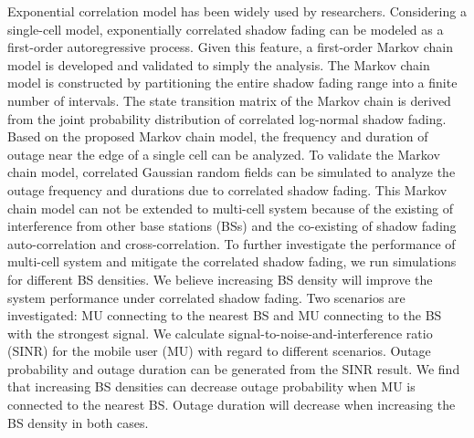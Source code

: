 \par Exponential correlation model \cite{gudmundson1991correlation} has been widely used by researchers. Considering a single-cell model, exponentially correlated shadow fading can be modeled as a first-order autoregressive process. Given this feature, a first-order Markov chain model is developed and validated  to simply the analysis. The Markov chain model is constructed by partitioning the entire shadow fading range into a finite number of intervals. The state transition matrix of the Markov chain is derived from the joint probability distribution of correlated log-normal shadow fading. Based on the proposed Markov chain model, the frequency and duration of outage near the edge of a single cell can be analyzed. To validate the Markov chain model, correlated Gaussian random fields can be simulated to analyze the outage frequency and durations due to correlated shadow fading. 
This Markov chain model can not be extended to multi-cell system because of the existing of interference from other base stations (BSs) and the co-existing of shadow fading auto-correlation and cross-correlation. To further investigate the performance of multi-cell system and mitigate the correlated shadow fading, we run simulations for different BS densities. We believe increasing BS density will improve the system performance under correlated shadow fading. Two scenarios are investigated: MU connecting to the nearest BS and MU connecting to the BS with the strongest signal. We calculate signal-to-noise-and-interference ratio (SINR) for the mobile user (MU) with regard to different scenarios. Outage probability and outage duration can be generated from the SINR result. We find that increasing BS densities can decrease outage probability when MU is connected to the nearest BS. Outage duration will decrease when increasing the BS density in both cases. 

